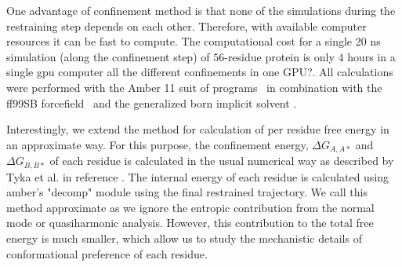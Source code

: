 \documentclass[12pt]{article}
\newcommand{\Alberto}[1]{\color{ForestGreen}#1\normalcolor }
\begin{document}
One advantage of confinement method is that
none of the simulations during the restraining step depends on each other. Therefore, with available computer resources it can be fast 
to compute. The computational cost for a single 20 ns simulation (along the confinement step) of $56$-residue protein 
is only $4$ hours in a single gpu computer  \Alberto{all the different confinements in one GPU?}. All calculations were
performed with the Amber 11 suit of programs~\cite{Case2012,Goetz2012} in combination with the ff99SB
forcefield~\cite{Hornak2006} and the generalized born implicit solvent \cite{Mongan2006}. 

Interestingly, we extend the
method for calculation of per residue free energy in an approximate way. For this purpose, the confinement energy,
$\Delta G_{A,A*}$ and $\Delta G_{B,B*}$ of each residue is calculated in the usual numerical way as described by
Tyka et al. in reference \cite{Tyka2006}. The internal energy of each residue is calculated using
amber's "decomp" module using the
final restrained trajectory. We call this method approximate as we ignore the entropic contribution from the normal mode
or quasiharmonic analysis. However, this contribution to the total free energy is much smaller, which allow us to study
the mechanistic details of conformational preference of each residue.  
\end{document}
